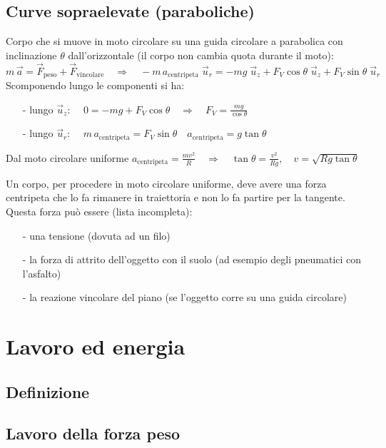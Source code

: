 \documentclass[a4paper]{article}
\newcommand\uz{\vec{u}_z}
\newcommand\ur{\vec{u}_r}
\begin{document}
\subsection{Curve sopraelevate (paraboliche)}
Corpo che si muove in moto circolare su una guida circolare a parabolica con inclinazione \(\theta\) dall'orizzontale (il corpo
non cambia quota durante il moto):
\[m \, \vec{a} = \vec{F}_\text{peso} + \vec{F}_\text{vincolare} \quad \Rightarrow \quad - m \, a_\text{centripeta} \; \ur = - mg \; \uz + F_V \cos \theta \; \uz + F_V \sin \theta \; \ur\]
Scomponendo lungo le componenti si ha:
\begin{itemize}[topsep=3pt, itemsep=0pt]
	\item[-] lungo \(\uz\): \(\displaystyle \quad 0 = - mg + F_V \cos \theta \quad \Rightarrow \quad F_V = \frac{mg}{\cos \theta}\)
	\item[-] lungo \(\ur\): \(\displaystyle \quad m \, a_\text{centripeta} = F_V \sin \theta \quad a_\text{centripeta} = g \tan \theta\)
\end{itemize}
Dal moto circolare uniforme \(\displaystyle a_\text{centripeta} = \frac{m v^2}{R} \quad \Rightarrow \quad \tan \theta = \frac{v^2}{Rg}, \quad v = \sqrt{Rg \tan \theta}\)

Un corpo, per procedere in moto circolare uniforme, deve avere una forza centripeta che lo fa rimanere in traiettoria e non lo fa
partire per la tangente. Questa forza può essere (lista incompleta):
\begin{itemize}[topsep=3pt, itemsep=0pt]
	\item[-] una tensione (dovuta ad un filo)
	\item[-] la forza di attrito dell'oggetto con il suolo (ad esempio degli pneumatici con l'asfalto)
	\item[-] la reazione vincolare del piano (se l'oggetto corre su una guida circolare)
\end{itemize}

\newpage

\section{Lavoro ed energia}
\subsection{Definizione}
\subsection{Lavoro della forza peso}
\end{document}
